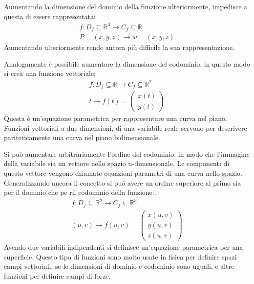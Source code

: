 \documentclass{article}
\numberwithin{equation}{subsection}
\begin{document}
Aumentando la dimensione del dominio della funzione ulteriormente, impedisce a questa di essere rappresentata:
\begin{gather*}
    f: D_f\subseteq\mathbb{R}^3\to C_f\subseteq\mathbb{R}\\
    P=(x,y,z)\to w=(x,y,z)
\end{gather*}
Aumentando ulteriormente rende ancora più difficile la sua rappresentazione. 


Analogamente è possibile aumentare la dimensione del codominio, in questo modo si crea una funzione vettoriale:
\begin{gather*}
    f:D_f\subseteq\mathbb{R}\to C_f\subseteq\mathbb{R}^2\\
    t\to f(t)=\begin{pmatrix}
        x(t)\\y(t)
    \end{pmatrix}
\end{gather*}
Questa è un'equazione parametrica per rappresentare una curva nel piano. Funzioni vettoriali a due dimensioni, di una variabile reale servono per descrivere pariteticamente una curva nel piano bidimensionale. 

Si può aumentare arbitrariamente l'ordine del codominio, in modo che l'immagine della variabile sia un vettore nello spazio $n$-dimensionale. Le componenti di questo vettore vengono chiamate equazioni parametri di una curva nello spazio. 
Generalizzando ancora il concetto si può avere un ordine superiore al primo sia per il dominio che pe ril codominio della funzione:.
\begin{gather*}
    f: D_f\subseteq\mathbb{R}^2\to C_f\subseteq\mathbb{R}^3\\
    (u,v)\to f(u,v)=\begin{pmatrix}
        x(u,v)\\y(u,v)\\z(u,v)
    \end{pmatrix}
\end{gather*}
Avendo due variabili indipendenti si definisce un'equazione parametrica per una superficie. Questo tipo di funzioni sono molto usate in fisica per definire spazi campi vettoriali, se le dimensioni di dominio e codominio sono uguali, e altre funzioni per definire campi di forze. 
\end{document}
